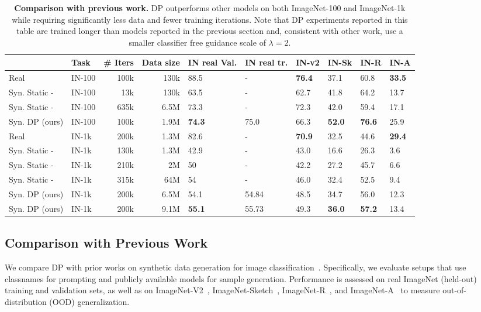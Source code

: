 \begin{table*}[h]
\centering
\caption{\textbf{Comparison with previous work.} DP outperforms other models on both ImageNet-100 and ImageNet-1k while requiring significantly less data and fewer training iterations. Note that DP experiments reported in this table are trained longer than models reported in the previous section and, consistent with other work, use a smaller classifier free guidance scale of $\lambda=2$.}
\vspace{0.1cm}
{\scriptsize
\begin{tabular}{llrrllllll}
\toprule
 & Task & \# Iters & Data size & IN real Val.& IN real tr.& IN-v2 & IN-Sk & IN-R & IN-A \\
\midrule
\midrule
Real & IN-100 & 100k & 130k & 88.5 & - & \textbf{76.4}&  37.1&  60.8& \textbf{33.5} \\
Syn. Static - \cite{sariyildiz2023fake}& IN-100 & 13k & 130k & 63.5 & - & 62.7&  41.8&  64.2& 13.7 \\
Syn. Static - \cite{sariyildiz2023fake} & IN-100 & 635k & 6.5M & 73.3 &- &72.3& 42.0& 59.4 & 17.1  \\
Syn. DP (ours) & IN-100  &100k & 1.9M & \textbf{74.3} & 75.0 & 66.3 &  \textbf{52.0}&  \textbf{76.6}& 25.9 \\
		
\midrule
Real & IN-1k & 200k & 1.3M & 82.6&-& \textbf{70.9}&  32.5&  44.6& \textbf{29.4} \\
Syn. Static - \cite{sariyildiz2023fake}& IN-1k  & 130k& 1.3M& 42.9& - & 43.0 &  16.6 &  26.3& 3.6 \\
Syn. Static - \cite{fan2024scaling}& IN-1k  & 210k& 2M & 50 & - & 42.2 & 27.2 & 45.7 & 6.6\\
Syn. Static - \cite{fan2024scaling}& IN-1k  & 315k& 64M& 54 & - & 46.0 & 32.4 &52.5 & 9.4\\
Syn. DP (ours)& IN-1k  & 200k & 6.5M & {54.1} & 54.84 &48.5 & 34.7 &  56.0&  12.3 \\
Syn. DP (ours) & IN-1k  & 200k & 9.1M & \textbf{55.1} & 55.73 &{49.3}&\textbf{36.0} &\textbf{57.2} & {13.4} \\
\bottomrule
\end{tabular}\label{tab:compare}
}
\end{table*}

\subsection{Comparison with Previous Work}
We compare DP with prior works on synthetic data generation for image classification~\citep{sariyildiz2023fake, fan2024scaling}. Specifically, we evaluate setups that use classnames for prompting and publicly available models for sample generation. Performance is assessed on real ImageNet (held-out) training and validation sets, as well as on ImageNet-V2~\citep{recht2019imagenet}, ImageNet-Sketch~\citep{wang2019learning}, ImageNet-R~\citep{hendrycks2021many}, and ImageNet-A~\citep{hendrycks2021natural} to measure out-of-distribution (OOD) generalization.

